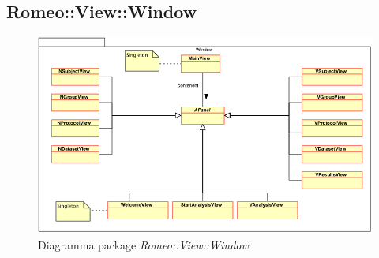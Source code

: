 \subsection{Romeo::View::Window}
	\begin{figure} [!h]
		\centering
		\includegraphics[scale=0.5] {./Content/Immagini/Window.png}
		\caption{Diagramma package \textsl{Romeo::View::Window}}
	\end{figure}
